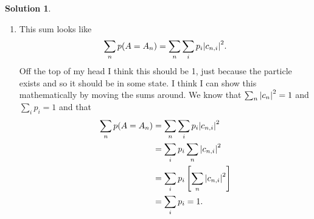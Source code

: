 \documentclass[10pt]{article}
\theoremstyle{definition}
\newtheorem{soln}{Solution}
\begin{document}
\begin{soln}
\begin{enumerate}[label=(\alph*)]
    \item This sum looks like
          $$\sum_n p(A=A_n)=\sum_n\sum_i p_i\abs{c_{n,i}}^2.$$
          Off the top of my head I think this should be 1, just because the particle exists and so it should be in some state. I think I can show this mathematically by moving
          the sums around. We know that $\sum_n\abs{c_n}^2=1$ and $\sum_ip_i=1$ and that
          \begin{align*}
            \sum_n p(A=A_n) & =\sum_n\sum_i p_i\abs{c_{n,i}}^2              \\
                            & =\sum_i p_i\sum_n\abs{c_{n,i}}^2              \\
                            & =\sum_i p_i\left[\sum_n\abs{c_{n,i}}^2\right] \\
                            & =\sum_i p_i=1.
          \end{align*}
  \end{enumerate}
\end{soln}
\end{document}
